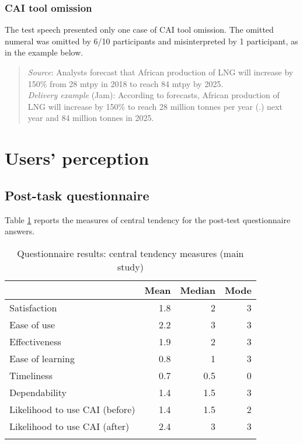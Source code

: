 \subsubsection{CAI tool omission}

The test speech presented only one case of CAI tool omission. The omitted numeral was omitted by 6/10 participants and misinterpreted by 1 participant, as in the example below.
\begin{quote}
    \textit{Source}: Analysts forecast that African production of LNG will increase by 150\% from 28 mtpy in 2018 to reach 84 mtpy by 2025.\\
\textit{Delivery example} (Jam): According to forecasts, African production of LNG will increase by 150\% to reach 28 million tonnes per year (.) next year and 84 million tonnes in 2025.
\end{quote}




\section{Users' perception}

\subsection{Post-task questionnaire}

Table \ref{tab:25} reports the measures of central tendency for the post-test questionnaire answers.

\begin{table}
\begin{tabular}{lrrr}
\lsptoprule
                                 & \multicolumn{1}{c}{Mean} & \multicolumn{1}{c}{Median} & \multicolumn{1}{c}{Mode} \\ \midrule
Satisfaction                     & 1.8           & 2\phantom{.5}   & 3             \\
Ease of use                      & 2.2           & 3\phantom{.5}   & 3             \\
Effectiveness                    & 1.9           & 2\phantom{.5}   & 3             \\
Ease of learning                 & 0.8           & 1\phantom{.5}   & 3             \\
Timeliness                       & 0.7           & 0.5             & 0             \\
Dependability                    & 1.4           & 1.5             & 3             \\ \midrule
Likelihood to use   CAI (before) & 1.4           & 1.5             & 2             \\
Likelihood to use   CAI (after)  & 2.4           & 3\phantom{.5}   & 3             \\ \lspbottomrule
\end{tabular}
\caption{Questionnaire results: central tendency measures (main study)\label{tab:25}}
\end{table}

